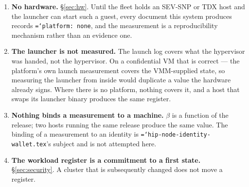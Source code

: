 \documentclass[11pt,a4paper]{article}
\newcommand{\code}[1]{\texttt{\hyphenchar\font=`\-\relax #1}}
\begin{document}
\begin{enumerate}[label=U\arabic*.,leftmargin=2.5em]
\item \textbf{No hardware.} \S\ref{sec:hw}. Until the fleet holds an SEV-SNP or
  TDX host and the launcher can start such a guest, every document this system
  produces records \code{platform: none}, and the measurement is a reproducibility
  mechanism rather than an evidence one.

\item \textbf{The launcher is not measured.} The launch log covers what the
  hypervisor was handed, not the hypervisor. On a confidential VM that is
  correct --- the platform's own launch measurement covers the VMM-supplied state,
  so measuring the launcher from inside would duplicate a value the hardware
  already signs. Where there is no platform, nothing covers it, and a host that
  swaps its launcher binary produces the same register.

\item \textbf{Nothing binds a measurement to a machine.} $\beta$ is a function of
  the release; two hosts running the same release produce the same value. The
  binding of a measurement to an identity is
  \code{hip-node-identity-wallet.tex}'s subject and is not attempted here.

\item \textbf{The workload register is a commitment to a first state.}
  \S\ref{sec:security}. A cluster that is subsequently changed does not move a
  register.
\end{enumerate}
\end{document}
